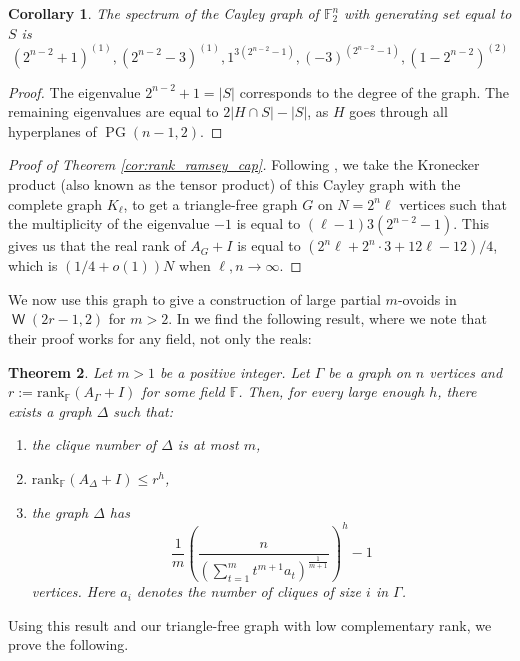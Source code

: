 \documentclass[a4paper,11pt]{amsproc}
\theoremstyle{plain}
\newtheorem{Theorem} {Theorem} [section]
\newtheorem{Corollary} [Theorem] {Corollary}
\theoremstyle{definition}
\newcommand{\Ff}{{\mathbb F}}
\newcommand{\<}{\langle}
\renewcommand{\>}{\rangle} %
\DeclareMathOperator\pg{\mathrm{PG}}
\DeclareMathOperator\w{\mathsf{W}}
\begin{document}
\begin{Corollary}
    The spectrum of the Cayley graph of $\mathbb{F}_2^n$ with generating set equal to $S$ is 
    \[(2^{n - 2} + 1)^{(1)}, (2^{n - 2} - 3)^{(1)}, 1^{3(2^{n - 2} - 1)}, (-3)^{(2^{n - 2} - 1)}, (1 - 2^{n - 2})^{(2)}\]
\end{Corollary}
\begin{proof}
    The eigenvalue $2^{n - 2} + 1 = |S|$ corresponds to the degree of the graph. 
    The remaining eigenvalues are equal to $2|H \cap S| - |S|$, as $H$ goes through all hyperplanes of $\pg(n - 1, 2)$. 
\end{proof}

\begin{proof}[Proof of Theorem \ref{cor:rank_ramsey_cap}]
Following \cite[Corollary 4.5]{BLS2024}, we take the Kronecker product (also known as the tensor product) of this Cayley graph with the complete graph $K_\ell$, to get a triangle-free graph $G$ on $N = 2^n \ell$ vertices such that the multiplicity of the eigenvalue $-1$ is equal to $(\ell - 1) 3 (2^{n - 2} - 1)$. 
This gives us that the real rank of $A_G + I$ is equal to $(2^n \ell + 2^n \cdot 3 + 12 \ell - 12)/4$, which is $(1/4 + o(1)) N$ when $\ell, n \rightarrow \infty$. 
\end{proof}


We now use this graph to give a construction of large partial $m$-ovoids in $\w(2r - 1, 2)$ for $m > 2$. 
In \cite[Theorem 4.6]{BLS2024}  we find the following result, where we note that their proof works for any field,
not only the reals:

\begin{Theorem}\label{thm:BLS}
  Let $m > 1$ be a positive integer.
  Let $\Gamma$ be a graph on $n$ vertices and $r := \mathrm{rank}_\Ff(A_\Gamma+I)$
  for some field $\Ff$. Then, for every large enough $h$, there exists a graph $\Delta$
  such that:
  \begin{enumerate}
   \item the clique number of $\Delta$ is at most $m$,
   \item $\mathrm{rank}_\Ff(A_\Delta+I) \leq r^h$,
   \item the graph $\Delta$ has
   \[
    \frac{1}{m} \left( \frac{n}{\left( \sum_{t=1}^m t^{m+1} a_t \right)^{\frac{1}{m+1}} } \right)^h - 1
   \]
  vertices. Here $a_i$ denotes the number of cliques of size $i$ in $\Gamma$.
  \end{enumerate}
\end{Theorem}


Using this result and our triangle-free graph with low complementary rank, we prove the following. 
\end{document}
